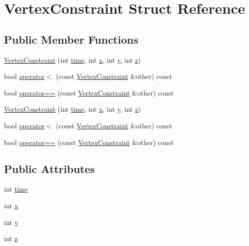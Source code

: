 \hypertarget{struct_vertex_constraint}{}\section{Vertex\+Constraint Struct Reference}
\label{struct_vertex_constraint}
\subsection*{Public Member Functions}
\begin{DoxyCompactItemize}
\item 
\hyperlink{struct_vertex_constraint_a9916de476d15970c6be19739d89b8ff3}{Vertex\+Constraint} (int \hyperlink{struct_vertex_constraint_a524c257a521498f549e35a966c5dc900}{time}, int \hyperlink{struct_vertex_constraint_a23167b86e213a24d74bb8a15472b862a}{x}, int \hyperlink{struct_vertex_constraint_a1c20e6282ccaeb862046c483c72ebd98}{y}, int \hyperlink{struct_vertex_constraint_a57867ee08f9c72a86684ea759693011f}{z})
\item 
bool \hyperlink{struct_vertex_constraint_a7c3dc8c528e5047776be956697979552}{operator$<$} (const \hyperlink{struct_vertex_constraint}{Vertex\+Constraint} \&other) const
\item 
bool \hyperlink{struct_vertex_constraint_aa1479e4f7de0f75536f144d224661f4b}{operator==} (const \hyperlink{struct_vertex_constraint}{Vertex\+Constraint} \&other) const
\item 
\hyperlink{struct_vertex_constraint_a9916de476d15970c6be19739d89b8ff3}{Vertex\+Constraint} (int \hyperlink{struct_vertex_constraint_a524c257a521498f549e35a966c5dc900}{time}, int \hyperlink{struct_vertex_constraint_a23167b86e213a24d74bb8a15472b862a}{x}, int \hyperlink{struct_vertex_constraint_a1c20e6282ccaeb862046c483c72ebd98}{y}, int \hyperlink{struct_vertex_constraint_a57867ee08f9c72a86684ea759693011f}{z})
\item 
bool \hyperlink{struct_vertex_constraint_a7c3dc8c528e5047776be956697979552}{operator$<$} (const \hyperlink{struct_vertex_constraint}{Vertex\+Constraint} \&other) const
\item 
bool \hyperlink{struct_vertex_constraint_aa1479e4f7de0f75536f144d224661f4b}{operator==} (const \hyperlink{struct_vertex_constraint}{Vertex\+Constraint} \&other) const
\end{DoxyCompactItemize}
\subsection*{Public Attributes}
\begin{DoxyCompactItemize}
\item 
int \hyperlink{struct_vertex_constraint_a524c257a521498f549e35a966c5dc900}{time}
\item 
int \hyperlink{struct_vertex_constraint_a23167b86e213a24d74bb8a15472b862a}{x}
\item 
int \hyperlink{struct_vertex_constraint_a1c20e6282ccaeb862046c483c72ebd98}{y}
\item 
int \hyperlink{struct_vertex_constraint_a57867ee08f9c72a86684ea759693011f}{z}
\end{DoxyCompactItemize}
